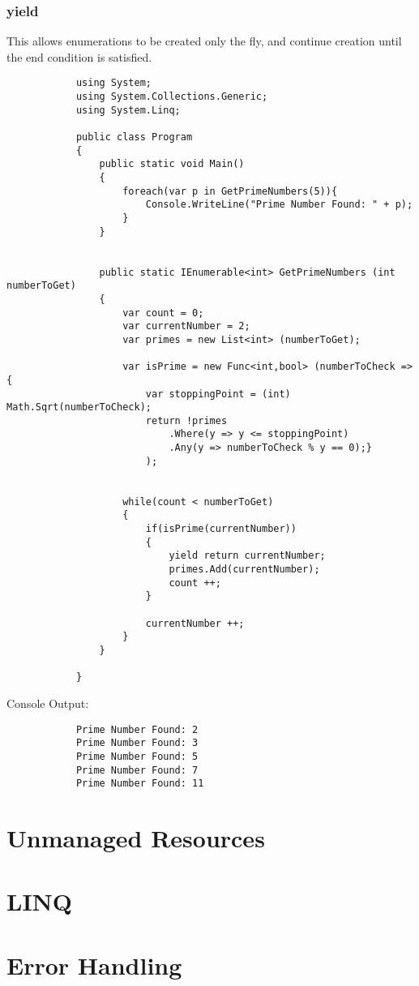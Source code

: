 \documentclass {amsart}
\begin{document}
		\subsubsection {yield}  This allows enumerations to be created only the fly, and continue creation until the end condition is satisfied.

		\begin{lstlisting}
			using System;
			using System.Collections.Generic;
			using System.Linq;

			public class Program
			{
				public static void Main()
				{
					foreach(var p in GetPrimeNumbers(5)){
						Console.WriteLine("Prime Number Found: " + p);	
					}
				}
				
				
				public static IEnumerable<int> GetPrimeNumbers (int numberToGet)
				{
					var count = 0;
					var currentNumber = 2;
					var primes = new List<int> (numberToGet); 

					var isPrime = new Func<int,bool> (numberToCheck => {
						var stoppingPoint = (int) Math.Sqrt(numberToCheck);
						return !primes
							.Where(y => y <= stoppingPoint)
							.Any(y => numberToCheck % y == 0);}
						); 		
					
					
					while(count < numberToGet)
					{
						if(isPrime(currentNumber))
						{
							yield return currentNumber;
							primes.Add(currentNumber);
							count ++;		   
						}
						
						currentNumber ++;
					}
				}
				
			}

		\end{lstlisting}
	Console Output: 
		\begin{verbatim}
			Prime Number Found: 2
			Prime Number Found: 3
			Prime Number Found: 5
			Prime Number Found: 7
			Prime Number Found: 11
		\end{verbatim}

\section{Unmanaged Resources}

\section{LINQ}

\section{Error Handling}
\end{document}
